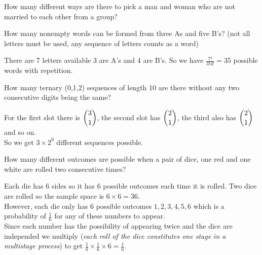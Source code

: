 
\begin{prob}
How many different ways are there to pick a man and woman who are not married to each other from a group?
\end{prob}


\begin{sol}
Someone $(n)$ and someone else's spouse $(n-1)$ can be picked from a group of $n$ married couples in $n(n-1)$ ways. \textit{(Yes I misread the question before).
\end{sol}


\begin{prob}
How many nonempty words can be formed from three As and five B’s?
(not all letters must be used, any sequence of letters counts as a word)
\end{prob}


\begin{sol}
There are 7 letters available 3 are A's and 4 are B's.
So we have $\frac{7!}{3!4!} = 35$ possible words with repetition. 
\end{sol}


\begin{prob}
How many ternary (0,1,2) sequences of length 10 are there without any two consecutive digits being the same?
\end{prob}

\begin{sol}
For the first slot there is $\dbinom{3}{1}$, the second slot has $\dbinom{2}{1}$, the third also has $\dbinom{2}{1}$ and so on. \\
So we get $3 \times 2^{9}$ different sequences possible. 
\end{sol}


\begin{prob}
How many different outcomes are possible when a pair of dice, one red and one white are rolled two consecutive times?
\end{prob}


\begin{sol}
Each die has 6 sides so it has 6 possible outcomes each time it is rolled. Two dice are rolled so the sample space is $6 \times 6 = 36$.\\

However, each die only has 6 possible outcomes $1, 2, 3, 4, 5, 6$ which is a probability of $\frac{1}{6}$ for any of these numbers to appear. \\

Since each number has the possibility of appearing twice and the dice are independed we multiply (\textit{each roll of the dice constitutes one stage in a multistage process}) to get $\frac{1}{6} \times \frac{1}{6} \times 6 = \frac{1}{6}$.
\end{sol}

